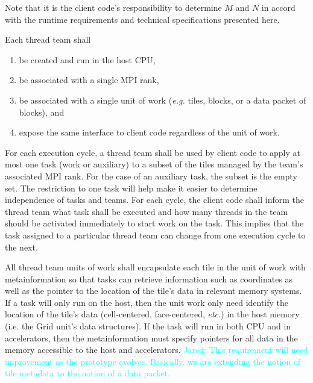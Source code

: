\documentclass{article}
\newcommand{\Jared}[1]          {\textcolor{cyan}{Jared: #1}}
\begin{document}
Note that it is the client code's responsibility to determine $M$ and $N$ in
accord with the runtime requirements and technical specifications presented
here.

\begin{req}
Each thread team shall
\begin{enumerate}
\item{be created and run in the host CPU,}
\item{be associated with a single MPI rank,}
\item{be associated with a single unit of work (\textit{e.g.} tiles, blocks, or a
data packet of blocks), and}
\item{expose the same interface to client code regardless of the unit of work.}
\end{enumerate}
\end{req}

\begin{req}
For each execution cycle, a thread team shall be used by client code to apply at
most one task (work or auxiliary) to a subset of the tiles managed by the team's
associated MPI rank.  For the case of an auxiliary task, the subset is the empty
set.  The restriction to one task will help make it easier to determine
independence of tasks and teams.  For each cycle, the client code shall inform
the thread team what task shall be executed and how many threads in the team
should be activated immediately to start work on the task.  This implies that
the task assigned to a particular thread team can change from one execution
cycle to the next.
\end{req}

\begin{req}
All thread team units of work shall encapsulate each tile in the unit of work
with metainformation so that tasks can retrieve information such as coordinates
as well as the pointer to the location of the tile's data in relevant memory
systems.  If a task will only run on the host, then the unit work only need
identify the location of the tile's data (cell-centered, face-centered,
\textit{etc.}) in the host memory (i.e. the Grid unit's data structures).  If
the task will run in both CPU and in accelerators, then the metainformation must
specify pointers for all data in the memory accessible to the host and
accelerators.  \Jared{This requirement will need improvement as the
prototype evolves.  Basically, we are extending the notion of tile metadata to
the notion of a data packet.}
\end{req}
\end{document}
